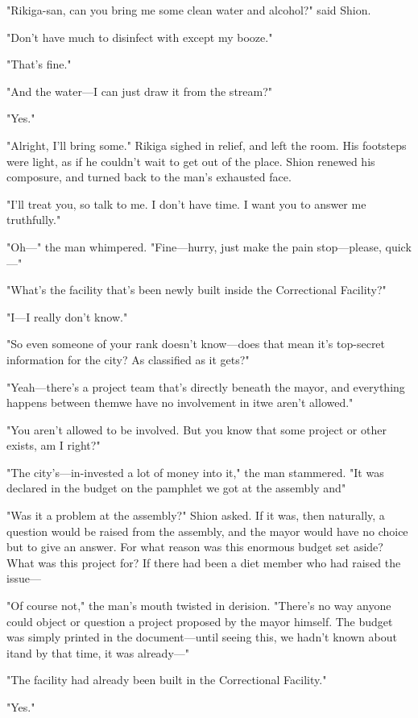 "Rikiga-san, can you bring me some clean water and alcohol?" said Shion.

"Don't have much to disinfect with except my booze."

"That's fine."

"And the water---I can just draw it from the stream?"

"Yes."

"Alright, I'll bring some." Rikiga sighed in relief, and left the room.
His footsteps were light, as if he couldn't wait to get out of the
place. Shion renewed his composure, and turned back to the man's
exhausted face.

"I'll treat you, so talk to me. I don't have time. I want you to answer
me truthfully."

"Oh---" the man whimpered. "Fine---hurry, just make the pain stop---please,
quick---"

"What's the facility that's been newly built inside the Correctional
Facility?"

"I---I really don't know."

"So even someone of your rank doesn't know---does that mean it's
top-secret information for the city? As classified as it gets?"

"Yeah---there's a project team that's directly beneath the mayor, and
everything happens between them\el we have no involvement in it\el we
aren't allowed."

"You aren't allowed to be involved. But you know that some project or
other exists, am I right?"

"The city's---in-invested a lot of money into it," the man stammered. "It
was declared in the budget on the pamphlet we got at the assembly\el 
and\el "

"Was it a problem at the assembly?" Shion asked. If it was, then
naturally, a question would be raised from the assembly, and the mayor
would have no choice but to give an answer. For what reason was this
enormous budget set aside? What was this project for? If there had been
a diet member who had raised the issue---

"Of course not," the man's mouth twisted in derision. "There's no way
anyone could object or question a project proposed by the mayor himself.
The budget was simply printed in the document---until seeing this, we
hadn't known about it\el and by that time, it was already---"

"The facility had already been built in the Correctional Facility."

"Yes."

